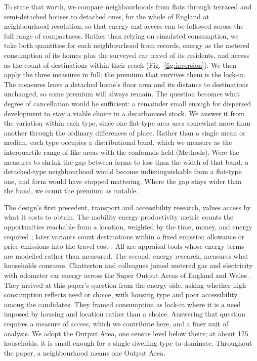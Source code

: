 \documentclass[pdflatex,sn-nature]{sn-jnl}
\begin{document}
To state that worth, we compare neighbourhoods from flats through terraced and semi-detached houses to detached ones, for the whole of England at neighbourhood resolution, so that energy and access can be followed across the full range of compactness. Rather than relying on simulated consumption, we take both quantities for each neighbourhood from records, energy as the metered consumption of its homes plus the surveyed car travel of its residents, and access as the count of destinations within their reach (Fig.~\ref{fig:inversion}). We then apply the three measures in full; the premium that survives them is the lock-in. The measures leave a detached home's floor area and its distance to destinations unchanged, so some premium will always remain. The question becomes what degree of cancellation would be sufficient: a remainder small enough for dispersed development to stay a viable choice in a decarbonised stock. We answer it from the variation within each type, since one flat-type area uses somewhat more than another through the ordinary differences of place. Rather than a single mean or median, each type occupies a distributional band, which we measure as the interquartile range of like areas with the confounds held (Methods). Were the measures to shrink the gap between forms to less than the width of that band, a detached-type neighbourhood would become indistinguishable from a flat-type one, and form would have stopped mattering. Where the gap stays wider than the band, we count the premium as notable.

The design's first precedent, transport and accessibility research, values access by what it costs to obtain. The mobility energy productivity metric counts the opportunities reachable from a location, weighted by the time, money, and energy required \citep{hou2019}; later variants count destinations within a fixed emission allowance \citep{kinigadner2020} or price emissions into the travel cost \citep{cui2018}. All are appraisal tools whose energy terms are modelled rather than measured. The second, energy research, measures what households consume. Chatterton and colleagues joined metered gas and electricity with odometer car energy across the Super Output Areas of England and Wales \citep{chatterton2016}. They arrived at this paper's question from the energy side, asking whether high consumption reflects need or choice, with housing type and poor accessibility among the candidates. They framed consumption as lock-in where it is a need imposed by housing and location rather than a choice. Answering that question requires a measure of access, which we contribute here, and a finer unit of analysis. We adopt the Output Area, one census level below theirs; at about 125 households, it is small enough for a single dwelling type to dominate. Throughout the paper, a neighbourhood means one Output Area.
\end{document}

